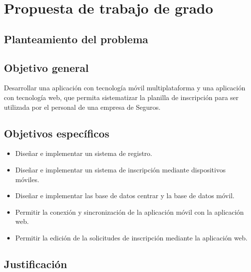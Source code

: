 \chapter{Propuesta de trabajo de grado}

\section{Planteamiento del problema}


\section{Objetivo general}

Desarrollar una aplicación con tecnología móvil multiplataforma y una aplicación con tecnología web, que permita sistematizar la planilla de inscripción para ser utilizada por el personal de una empresa de Seguros. 

\section{Objetivos específicos}

\begin{itemize}

	\item Diseñar e implementar un sistema de registro.
	
	\item Diseñar e implementar un sistema de inscripción mediante dispositivos móviles.
	
	\item Diseñar e implementar las base de datos centrar y la base de datos móvil.
	
	\item Permitir la conexión y sincronización de la aplicación móvil con la aplicación web.
	
	\item Permitir la edición de la solicitudes de inscripción mediante la aplicación web.
	
	

\end{itemize}

\section{Justificación}

